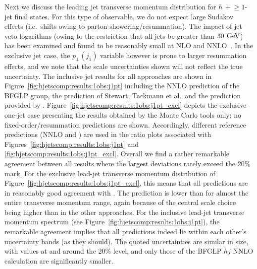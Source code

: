 Next we discuss the leading jet transverse momentum distribution for
$h\,+\!\ge\!1$-jet final states. For this type of observable, we do
not expect large Sudakov effects (i.e.~shifts owing to parton
showering/resummation). The impact of jet veto logarithms (owing to
the restriction that all jets be greater than $30\,\text{\:GeV}$) has been
examined and found to be reasonably small at NLO and
NNLO~\cite{Banfi:2012jm,Banfi:2015pju}.
In the exclusive jet case, the $p_\perp(j_1)$ variable however is
prone to larger resummation effects, and we note that the scale
uncertainties shown will not reflect the true uncertainty. The
inclusive jet results for all approaches are shown in
Figure~\ref{fig:hjetscomp:results:1obs:j1pt} including the NNLO
prediction of the BFGLP group, the prediction of Stewart, Tackmann
et al.~and the prediction provided by \hjetscompResbos.
Figure~\ref{fig:hjetscomp:results:1obs:j1pt_excl} depicts the
exclusive one-jet case presenting the results obtained by the Monte
Carlo tools only; no fixed-order/resummation predictions are shown.
Accordingly, different reference predictions (NNLO and \hjetscompPowheg) are
used in the ratio plots associated with
Figures~\ref{fig:hjetscomp:results:1obs:j1pt} and
\ref{fig:hjetscomp:results:1obs:j1pt_excl}. 
Overall we find a rather remarkable agreement
between all results where the largest deviations rarely exceed the
20\% mark. For the exclusive lead-jet transverse momentum distribution
of Figure~\ref{fig:hjetscomp:results:1obs:j1pt_excl}, this means that
all predictions are in reasonably good agreement with \hjetscompPowheg. The
\hjetscompMGaMC prediction is lower than \hjetscompPowheg for almost the entire
transverse momentum range, again because of the central scale choice
being higher than in the other approaches. For the inclusive lead-jet
transverse momentum spectrum (see
Figure~\ref{fig:hjetscomp:results:1obs:j1pt}), the remarkable
agreement implies that all predictions indeed lie within each other's
uncertainty bands (as they should). The quoted uncertainties are similar in size, with
values at and around the 20\% level, and only those of the BFGLP $hj$
NNLO calculation are significantly smaller. 

